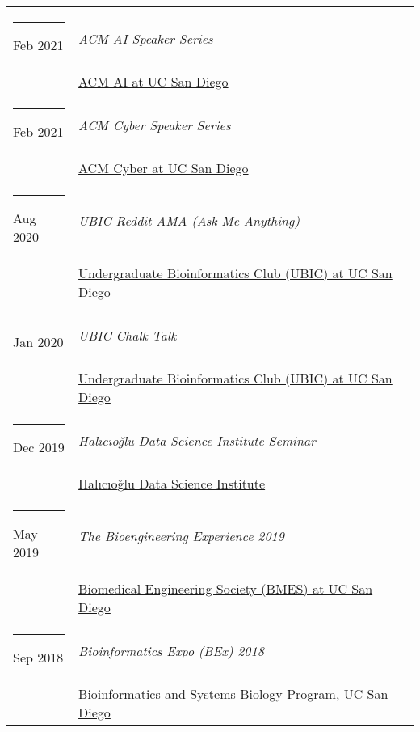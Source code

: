 \documentclass[margin,line]{res}
\begin{document}
\begin{resume}
\begin{longtable}{@{}p{0.7in}p{4in}}
\hspace*{-4mm} \rule{-1mm}{5mm} Feb 2021 & \textit{ACM AI Speaker Series}\\*
\hspace*{-4mm} & \hspace{4mm} \href{https://ai.acmucsd.com/}{ACM AI at UC San Diego}\\
\hspace*{-4mm} \rule{-1mm}{5mm} Feb 2021 & \textit{ACM Cyber Speaker Series}\\*
\hspace*{-4mm} & \hspace{4mm} \href{https://www.facebook.com/cyberucsd}{ACM Cyber at UC San Diego}\\
\hspace*{-4mm} \rule{-1mm}{5mm} Aug 2020 & \textit{UBIC Reddit AMA (Ask Me Anything)}\\*
\hspace*{-4mm} & \hspace{4mm} \href{http://ubicucsd.github.io/}{Undergraduate Bioinformatics Club (UBIC) at UC San Diego}\\
\hspace*{-4mm} \rule{-1mm}{5mm} Jan 2020 & \textit{UBIC Chalk Talk}\\*
\hspace*{-4mm} & \hspace{4mm} \href{http://ubicucsd.github.io/}{Undergraduate Bioinformatics Club (UBIC) at UC San Diego}\\
\hspace*{-4mm} \rule{-1mm}{5mm} Dec 2019 & \textit{Hal{\i}c{\i}o{\u g}lu Data Science Institute Seminar}\\*
\hspace*{-4mm} & \hspace{4mm} \href{https://datascience.ucsd.edu/}{Hal{\i}c{\i}o{\u g}lu Data Science Institute}\\
\hspace*{-4mm} \rule{-1mm}{5mm} May 2019 & \textit{The Bioengineering Experience 2019}\\*
\hspace*{-4mm} & \hspace{4mm} \href{http://bmes.ucsd.edu/}{Biomedical Engineering Society (BMES) at UC San Diego}\\
\hspace*{-4mm} \rule{-1mm}{5mm} Sep 2018 & \textit{Bioinformatics Expo (BEx) 2018}\\*
\hspace*{-4mm} & \hspace{4mm} \href{http://bioinformatics.ucsd.edu/}{Bioinformatics and Systems Biology Program, UC San Diego}\\

\end{longtable}
\end{resume}
\end{document}
